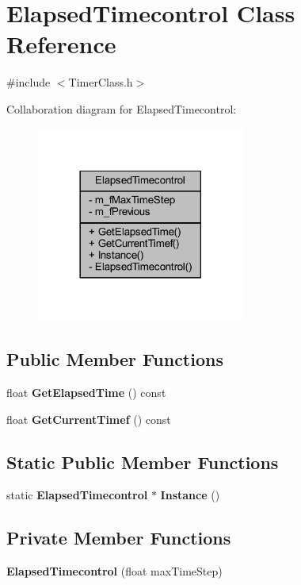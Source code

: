 \section{Elapsed\+Timecontrol Class Reference}
\label{class_elapsed_timecontrol}


{\ttfamily \#include $<$Timer\+Class.\+h$>$}



Collaboration diagram for Elapsed\+Timecontrol\+:\nopagebreak
\begin{figure}[H]
\begin{center}
\leavevmode
\includegraphics[width=194pt]{d1/d11/class_elapsed_timecontrol__coll__graph}
\end{center}
\end{figure}
\subsection*{Public Member Functions}
\begin{DoxyCompactItemize}
\item 
float {\bf Get\+Elapsed\+Time} () const 
\item 
float {\bf Get\+Current\+Timef} () const 
\end{DoxyCompactItemize}
\subsection*{Static Public Member Functions}
\begin{DoxyCompactItemize}
\item 
static {\bf Elapsed\+Timecontrol} $\ast$ {\bf Instance} ()
\end{DoxyCompactItemize}
\subsection*{Private Member Functions}
\begin{DoxyCompactItemize}
\item 
{\bf Elapsed\+Timecontrol} (float max\+Time\+Step)
\end{DoxyCompactItemize}
